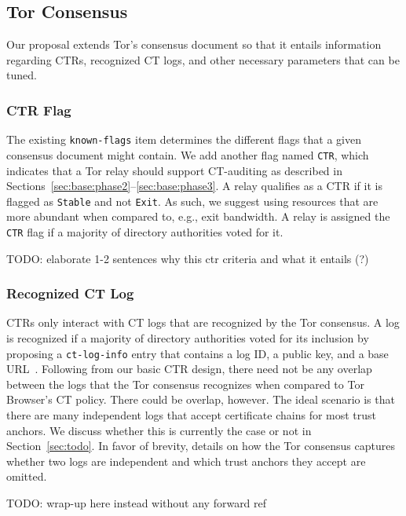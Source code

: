 \subsection{Tor Consensus} \label{sec:base:consensus}
Our proposal extends Tor's consensus document
so that it entails information regarding
	CTRs,
	recognized CT logs, and
	other necessary parameters that can be tuned.

\subsubsection{CTR Flag} \label{sec:base:consensus:ctr-flag}
The existing \texttt{known-flags} item determines the different flags that a 
given consensus document might contain.  We add another flag named \texttt{CTR},
which indicates that a Tor relay should support CT-auditing as described in
Sections~\ref{sec:base:phase2}--\ref{sec:base:phase3}.  A relay qualifies as a
CTR if it is flagged as \texttt{Stable} and not \texttt{Exit}.  As such, we
suggest using resources that are more abundant when compared to, e.g., exit
bandwidth.  A relay is assigned the \texttt{CTR} flag if a majority of directory
authorities voted for it.

TODO: elaborate 1-2 sentences why this ctr criteria and what it entails (?)

\subsubsection{Recognized CT Log} \label{sec:base:consensus:log}
CTRs only interact with CT logs that are recognized by the Tor consensus.  A log
is recognized if a majority of directory authorities voted for its inclusion by
proposing a \texttt{ct-log-info} entry that contains a log ID, a public key, and
a base URL~\cite{ct,ct/bis}. 
Following from our basic CTR design, there need not be any overlap between the
logs that the Tor consensus recognizes when compared to Tor Browser's CT policy.
There could be overlap, however.  The ideal scenario is that there are many
independent logs that accept certificate chains for most trust anchors.  We
discuss whether this is currently the case or not in Section~\ref{sec:todo}.  In
favor of brevity, details on how the Tor consensus captures whether two logs are
independent and which trust anchors they accept are omitted.

TODO: wrap-up here instead without any forward ref

